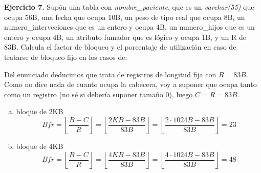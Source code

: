 \documentclass[12pt]{report}
\begin{document}
\textbf{Ejercicio 7.} Supón una tabla con \textit{nombre\_paciente},  que es un \textit{varchar(55)} que ocupa 56B, una fecha que ocupa 10B, un peso de tipo real que ocupa 8B, un numero\_interveciones que es un entero y ocupa 4B, un numero\_hijos que es un entero y ocupa 4B, un atributo fumador que es lógico y ocupa 1B, y un R de 83B. Calcula el factor de bloqueo y el porcentaje de utilización en caso de tratarse de bloqueo fijo en los casos de:

Del enunciado deducimos que trata de registros de longitud fija con $R=83B$. Como no dice nada de cuanto ocupa la cabecera, voy a suponer que ocupa tanto como un registro (no sé si debería suponer tamaño 0), luego $C=R=83B$.

\begin{enumerate}[(a)]
\item bloque de 2KB
\[
Bfr=\left\lfloor\frac{B-C}{R}\right\rfloor=\left\lfloor\frac{2KB-83B}{83B}\right\rfloor=\left\lfloor\frac{2\cdot 1024B-83B}{83B}\right\rfloor=23
\]
\item bloque de 4KB
\[
Bfr=\left\lfloor\frac{B-C}{R}\right\rfloor=\left\lfloor\frac{4KB-83B}{83B}\right\rfloor=\left\lfloor\frac{4\cdot 1024B-83B}{83B}\right\rfloor=48
\]
\end{enumerate}
\end{document}
